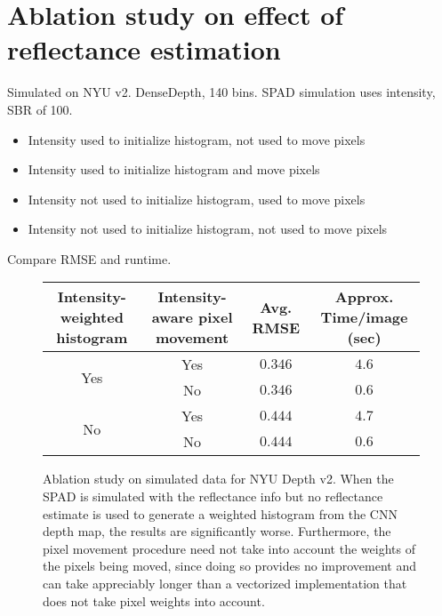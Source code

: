 \documentclass[10pt,letterpaper]{article}
\begin{document}
\section{Ablation study on effect of reflectance estimation}
Simulated on NYU v2. DenseDepth, 140 bins. SPAD simulation uses intensity, SBR
of 100.
\begin{itemize}
  \item Intensity used to initialize histogram, not used to move pixels
  \item Intensity used to initialize histogram and move pixels
  \item Intensity not used to initialize histogram, used to move pixels
  \item Intensity not used to initialize histogram, not used to move pixels
\end{itemize}
Compare RMSE and runtime.
\begin{figure}[H]
  \centering
  \begin{tabular}{c|c|cc}
    \toprule
    Intensity-weighted histogram & Intensity-aware pixel movement & Avg. RMSE & Approx. Time/image (sec) \\
    \midrule
    \multirow{2}{*}{Yes} & Yes & $0.346$ & $4.6$ \\
                         & No & $0.346$ & $0.6$ \\
    \midrule
    \multirow{2}{*}{No} & Yes & $0.444$ & $4.7$ \\
                        & No & $0.444$ & $0.6$ \\
    \bottomrule
  \end{tabular}
  \caption{Ablation study on simulated data for NYU Depth v2. When the SPAD
    is simulated with the reflectance info but no reflectance estimate is used
    to generate a weighted histogram from the CNN depth map, the results are
    significantly worse. Furthermore, the pixel movement procedure need not take
  into account the weights of the pixels being moved, since doing so provides no
improvement and can take appreciably longer than a vectorized implementation
that does not take pixel weights into account.}
\end{figure}
\end{document}
